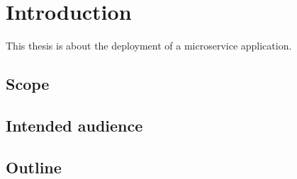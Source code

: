 
\chapter{Introduction} %

\label{chap:introd} %






This thesis is about the deployment of a microservice application.



\section{Scope}
\section{Intended audience}


\section{Outline}

